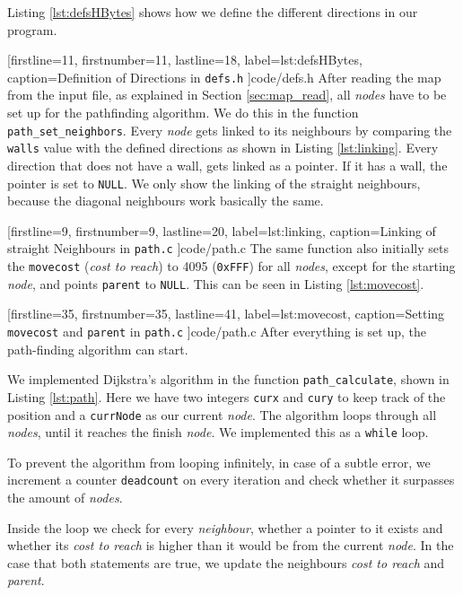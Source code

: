 Listing \ref{lst:defsHBytes} shows how we define the different directions in our program.


[firstline=11,			%
firstnumber=11,			%
lastline=18,			%
label=lst:defsHBytes,	%
caption={Definition of Directions in {\tt defs.h}}
]{code/defs.h}
%
After reading the map from the input file,
as explained in Section \ref{sec:map_read},
all \emph{nodes} have to be set up for the pathfinding algorithm.
We do this in the function {\tt path\_set\_neighbors}.
Every \emph{node} gets linked to its neighbours by comparing the {\tt walls} value
with the defined directions as shown in Listing \ref{lst:linking}.
Every direction that does not have a wall,
gets linked as a pointer.
If it has a wall, the pointer is set to {\tt NULL}.
We only show the linking of the straight neighbours,
because the diagonal neighbours work basically the same.


[firstline=9,			%
firstnumber=9,
lastline=20,			%
label=lst:linking,		%
caption={Linking of straight Neighbours in {\tt path.c}}
]{code/path.c}
%
The same function also initially sets the {\tt movecost}
(\emph{cost to reach}) to 4095 ({\tt 0xFFF}) for all \emph{nodes},
except for the starting \emph{node},
and points {\tt parent} to {\tt NULL}.
This can be seen in Listing \ref{lst:movecost}.


[firstline=35,			%
firstnumber=35,
lastline=41,			%
label=lst:movecost,	%
caption={Setting {\tt movecost} and {\tt parent} in {\tt path.c}}
]{code/path.c}
%
After everything is set up,
the path-finding algorithm can start.

We implemented Dijkstra's algorithm in the function {\tt path\_calculate},
shown in Listing \ref{lst:path}.
Here we have two integers {\tt curx} and {\tt cury} to keep track of the position
and a {\tt currNode} as our current \emph{node}.
The algorithm loops through all \emph{nodes},
until it reaches the finish \emph{node}.
We implemented this as a {\tt while} loop.

To prevent the algorithm from looping infinitely,
in case of a subtle error,
we increment a counter {\tt deadcount} on every iteration
and check whether it surpasses the amount of \emph{nodes}.

Inside the loop we check for every \emph{neighbour},
whether a pointer to it exists
and whether its \emph{cost to reach} is higher than it would be from the current \emph{node}.
In the case that both statements are true,
we update the neighbours \emph{cost to reach}
and \emph{parent}.

